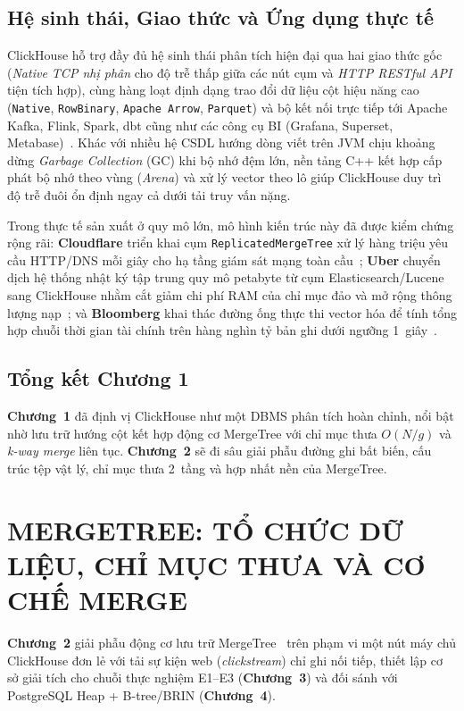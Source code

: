 \documentclass[13pt,a4paper]{report}
\begin{document}
\section{Hệ sinh thái, Giao thức và Ứng dụng thực tế}
ClickHouse hỗ trợ đầy đủ hệ sinh thái phân tích hiện đại qua hai giao thức gốc (\textit{Native TCP nhị phân} cho độ trễ thấp giữa các nút cụm và \textit{HTTP RESTful API} tiện tích hợp), cùng hàng loạt định dạng trao đổi dữ liệu cột hiệu năng cao (\texttt{Native}, \texttt{RowBinary}, \texttt{Apache Arrow}, \texttt{Parquet}) và bộ kết nối trực tiếp tới Apache Kafka, Flink, Spark, dbt cũng như các công cụ BI (Grafana, Superset, Metabase)~\cite{S1, S18}. Khác với nhiều hệ CSDL hướng dòng viết trên JVM chịu khoảng dừng \textit{Garbage Collection} (GC) khi bộ nhớ đệm lớn, nền tảng C++ kết hợp cấp phát bộ nhớ theo vùng (\textit{Arena}) và xử lý vector theo lô giúp ClickHouse duy trì độ trễ đuôi ổn định ngay cả dưới tải truy vấn nặng.

Trong thực tế sản xuất ở quy mô lớn, mô hình kiến trúc này đã được kiểm chứng rộng rãi: \textbf{Cloudflare} triển khai cụm \texttt{ReplicatedMergeTree} xử lý hàng triệu yêu cầu HTTP/DNS mỗi giây cho hạ tầng giám sát mạng toàn cầu~\cite{B1}; \textbf{Uber} chuyển dịch hệ thống nhật ký tập trung quy mô petabyte từ cụm Elasticsearch/Lucene sang ClickHouse nhằm cắt giảm chi phí RAM của chỉ mục đảo và mở rộng thông lượng nạp~\cite{B2}; và \textbf{Bloomberg} khai thác đường ống thực thi vector hóa để tính tổng hợp chuỗi thời gian tài chính trên hàng nghìn tỷ bản ghi dưới ngưỡng 1~giây~\cite{B3}.

\section{Tổng kết Chương 1}
\textbf{Chương~1} đã định vị ClickHouse như một DBMS phân tích hoàn chỉnh, nổi bật nhờ lưu trữ hướng cột kết hợp động cơ MergeTree với chỉ mục thưa $O(N/g)$ và \textit{k-way merge} liên tục. \textbf{Chương~2} sẽ đi sâu giải phẫu đường ghi bất biến, cấu trúc tệp vật lý, chỉ mục thưa 2~tầng và hợp nhất nền của MergeTree.

\chapter{MERGETREE: TỔ CHỨC DỮ LIỆU, CHỈ MỤC THƯA VÀ CƠ CHẾ MERGE}

\textbf{Chương~2} giải phẫu động cơ lưu trữ MergeTree~\cite{A1, S2} trên phạm vi một nút máy chủ ClickHouse đơn lẻ với tải sự kiện web (\textit{clickstream}) chỉ ghi nối tiếp, thiết lập cơ sở giải tích cho chuỗi thực nghiệm E1--E3 (\textbf{Chương~3}) và đối sánh với PostgreSQL Heap + B-tree/BRIN (\textbf{Chương~4}).
\end{document}

